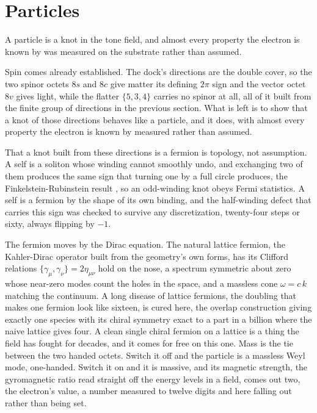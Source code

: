 \section{Particles}

A particle is a knot in the tone field, and almost every property the electron is known by was measured on the substrate rather than assumed. \cite{pollard2026vibetest}

Spin comes already established. The dock's directions are the double cover, so the two spinor octets $8s$ and $8c$ give matter its defining $2\pi$ sign and the vector octet $8v$ gives light, while the flatter $\{5,3,4\}$ carries no spinor at all, all of it built from the finite group of directions in the previous section. What is left is to show that a knot of those directions behaves like a particle, and it does, with almost every property the electron is known by measured rather than assumed.

That a knot built from these directions is a fermion is topology, not assumption. A self is a soliton whose winding cannot smoothly undo, and exchanging two of them produces the same sign that turning one by a full circle produces, the Finkelstein-Rubinstein result \cite{finkelsteinrubinstein1968}, so an odd-winding knot obeys Fermi statistics. A self is a fermion by the shape of its own binding, and the half-winding defect that carries this sign was checked to survive any discretization, twenty-four steps or sixty, always flipping by $-1$.

The fermion moves by the Dirac equation. The natural lattice fermion, the Kahler-Dirac operator built from the geometry's own forms, has its Clifford relations $\{\gamma_\mu, \gamma_\nu\} = 2\eta_{\mu\nu}$ hold on the nose, a spectrum symmetric about zero whose near-zero modes count the holes in the space, and a massless cone $\omega = c\,k$ matching the continuum. A long disease of lattice fermions, the doubling that makes one fermion look like sixteen, is cured here, the overlap construction giving exactly one species with its chiral symmetry exact to a part in a billion where the naive lattice gives four. A clean single chiral fermion on a lattice is a thing the field has fought for decades, and it comes for free on this one. Mass is the tie between the two handed octets. Switch it off and the particle is a massless Weyl mode, one-handed. Switch it on and it is massive, and its magnetic strength, the gyromagnetic ratio read straight off the energy levels in a field, comes out two, the electron's value, a number measured to twelve digits and here falling out rather than being set.

